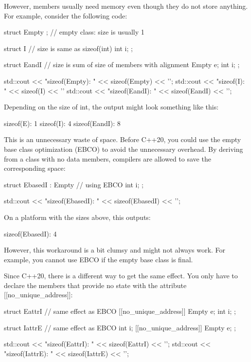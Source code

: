 However, members usually need memory even though they do not store anything. For example, consider the following code:

\begin{cpp}
struct Empty {}; // empty class: size is usually 1

struct I { // size is same as sizeof(int)
	int i;
};

struct EandI { // size is sum of size of members with alignment
	Empty e;
	int i;
};

std::cout << "sizeof(Empty): " << sizeof(Empty) << '\n';
std::cout << "sizeof(I): " << sizeof(I) << '\n'
std::cout << "sizeof(EandI): " << sizeof(EandI) << '\n';
\end{cpp}

Depending on the size of int, the output might look something like this:

\begin{shell}
sizeof(E):     1
sizeof(I):     4
sizeof(EandI): 8
\end{shell}

This is an unnecessary waste of space. Before C++20, you could use the empty base class optimization (EBCO) to avoid the unnecessary overhead. By deriving from a class with no data members, compilers are allowed to save the corresponding space:

\begin{cpp}
struct EbasedI : Empty { // using EBCO
	int i;
};

std::cout << "sizeof(EbasedI): " << sizeof(EbasedI) << '\n';
\end{cpp}

On a platform with the sizes above, this outputs:

\begin{shell}
sizeof(EbasedI): 4
\end{shell}

However, this workaround is a bit clumsy and might not always work. For example, you cannot use EBCO if the empty base class is final.

Since C++20, there is a different way to get the same effect. You only have to declare the members that provide no state with the attribute [[no\_unique\_address]]:

\begin{cpp}
struct EattrI { // same effect as EBCO
	[[no_unique_address]] Empty e;
	int i;
};

struct IattrE { // same effect as EBCO
	int i;
	[[no_unique_address]] Empty e;
};

std::cout << "sizeof(EattrI): " << sizeof(EattrI) << '\n';
std::cout << "sizeof(IattrE): " << sizeof(IattrE) << '\n';
\end{cpp}

